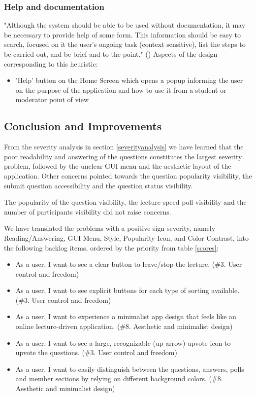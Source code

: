 \documentclass{article}
\begin{document}
\subsubsection{Help and documentation\label{10thheuristic}}
"Although the system should be able to be used without documentation, it may be necessary to provide help of some form. This information should be easy to search, focused on it the user's ongoing task (context sensitive), list the steps to be carried out, and be brief and to the point." (\textcite{Nielsen1994})
Aspects of the design corresponding to this heuristic:
\begin{itemize}
\item 'Help' button on the Home Screen which opens a popup informing the user on the purpose of the application and how to use it from a student or moderator point of view
\end{itemize}

\subsection{Conclusion and Improvements\label{conclusion}}

From the severity analysis in section \ref{severityanalysis} we have learned that the poor readability and answering of the questions
constitutes the largest severity problem, followed by the unclear GUI menu and the aesthetic layout of the application. Other concerns
pointed towards the question popularity visibility, the submit question accessibility and the question status visibility.

The popularity of the question visibility, the lecture speed poll visibility and the number of participants visibility did not
raise concerns.

We have translated the problems with a positive sign severity, namely Reading/Answering, GUI Menu, Style, Popularity Icon,
and Color Contrast, into the following backlog items, ordered by the priority from table \ref{scores}:

\begin{itemize}
    \item As a user, I want to see a clear button to leave/stop the lecture. (\#3. User control and freedom)
    \item As a user, I want to see explicit buttons for each type of sorting available.(\#3. User control and freedom)
    \item As a user, I want to experience a minimalist app design that feels like an online lecture-driven application. (\#8. Aesthetic and minimalist design)
    \item As a user, I want to see a large, recognizable (up arrow) upvote icon to upvote the questions. (\#3. User control and freedom)
    \item As a user, I want to easily distinguish between the questions, answers, polls and member sections by relying on
    different background colors. (\#8. Aesthetic and minimalist design)
\end{itemize}
\end{document}
